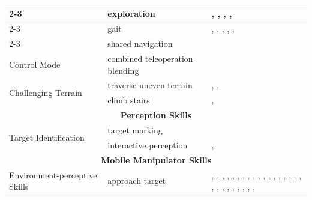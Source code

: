 \begin{table}[p]
\begin{tabular}{|p{4cm}|p{5cm}|p{15cm}|}
\cline{2-3}
    & exploration                     & \cite{Schmalstieg2023LearningHI}, \cite{Chang2006ABB}, \cite{Wasik2002AFB}, \cite{Chang2006AnalysisOA}, \cite{Nagatani2000MotionDF} \\
\cline{2-3}
    & gait                            & \cite{Arm2024PedipulateEM}, \cite{Lim2008MultipleHC}, \cite{Xiao2025AutonomousBC}, \cite{Kumbhar2025MPCQPBasedCF}, \cite{Dadiotis2025DynamicOG}, \cite{Zhang2025AgentWorldAI} \\
\cline{2-3}
    & shared navigation               & \cite{Bruemmer2010BehaviorBC} \\
\hline
\multirow{1}{*}{\parbox{2cm}{Control Mode}}
    & combined teleoperation blending & \cite{Maeda2022BlendingPP} \\
\hline
\multirow{2}{*}{\parbox{3cm}{Challenging Terrain}}
    & traverse uneven terrain         & \cite{Singh2013CoordinatingMM}, \cite{Schwarz2016HybridDL}, \cite{Karumanchi2017TeamRS} \\
\cline{2-3}
    & climb stairs                    & \cite{Schwarz2016HybridDL}, \cite{Karumanchi2017TeamRS} \\
\hline
\multicolumn{3}{|c|}{\textbf{Perception Skills}} \\
\hline
\multirow{2}{*}{\parbox{3cm}{Target Identification}}
    & target marking           & \cite{Bruemmer2010BehaviorBC} \\
\cline{2-3}
    & interactive perception & \cite{Kenney2009InteractiveSF}, \cite{engelbracht2024spotlightroboticsceneunderstanding} \\
\hline
\multicolumn{3}{|c|}{\textbf{Mobile Manipulator Skills}} \\
\hline
\multirow{2}{*}{\parbox{4cm}{Environment-perceptive Skills}}
    & approach target                          & \cite{Gray2013ASP}, \cite{Weser2009AutonomousPF}, \cite{Sayyaadi2014ControlON}, \cite{Laaksonen2010EmbodimentIM}, \cite{Frasca2020GoingCA}, \cite{Stulp2009LearningAP}, \cite{Tsay2010MaterialHO}, \cite{Toner2024PRFAP}, \cite{Kostavelis2022RoboticAI}, \cite{Lim2008MultipleHC}, \cite{Chang2006ABB}, \cite{Wasik2002AFB}, \cite{MacKenzie1996BehaviorbasedMM}, \cite{Stroupe2005BehaviorbasedMC}, \cite{Nagatani1996DesigningSA}, \cite{Nagatani1996DooropeningBO}, \cite{Choi2009HandIO}, \cite{Nagatani2000MotionDF}, \cite{Zsoldos2025TowardsRL}, \cite{Beetz2011GeneralityAL}, \cite{Yang2026VisionLanguageActionME}, \cite{Kotecha2024AHM}, \cite{Lopes2026CARGOAM}, \cite{Lee2025LearningCL}, \cite{Gupta2025PreciseMM}, \cite{Shan2026DockAnywhereDV}, \cite{Fu2024MobileAL}, \cite{Watanabe2025IntegratingBP} \\

\end{tabular}
\end{table}
